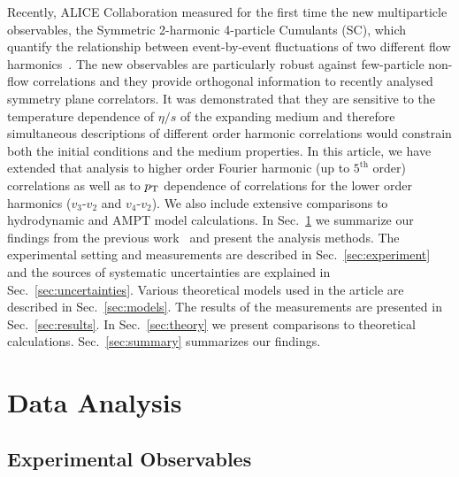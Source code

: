 Recently, ALICE Collaboration measured for the first time the new multiparticle observables, the Symmetric 2-harmonic 4-particle Cumulants (SC), which quantify the relationship between event-by-event fluctuations of two different flow harmonics~\cite{ALICE:2016kpq}. 
The new observables are particularly robust against few-particle non-flow correlations and they provide orthogonal information to recently analysed symmetry plane correlators. 
It was demonstrated that they are sensitive to the temperature dependence of $\eta/s$ of the expanding medium and therefore simultaneous descriptions of different order harmonic correlations would constrain both the initial conditions and the medium properties.
In this article, we have extended that analysis to higher order Fourier harmonic (up to $5^{\mathrm{th}}$ order) correlations as well as to $p_{\rm T}$ dependence of correlations for the lower order harmonics ($v_3$-$v_2$ and $v_4$-$v_2$).  We also include extensive comparisons to hydrodynamic and AMPT model calculations.
In Sec.~\ref{sec:method} we summarize our findings from the previous work~\cite{ALICE:2016kpq} and present the analysis methods. The experimental setting and measurements are described in Sec.~\ref{sec:experiment} and the sources of systematic uncertainties are explained in Sec.~\ref{sec:uncertainties}. Various theoretical models used in the article are described in Sec.~\ref{sec:models}. The results of the measurements are presented in Sec.~\ref{sec:results}.
 In Sec.~\ref{sec:theory} we present comparisons to theoretical calculations. Sec.~\ref{sec:summary} summarizes our findings.
 
 
\section{Data Analysis}
\label{sec:method}
\subsection{Experimental Observables}

